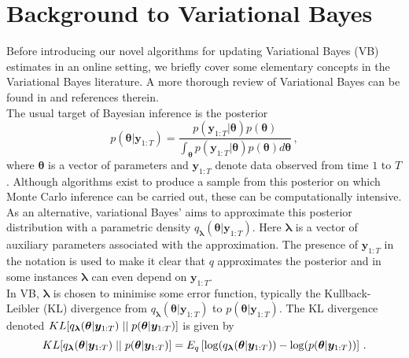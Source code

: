 \documentclass[12pt,a4paper]{article}\usepackage[]{graphicx}\usepackage[]{color}
\begin{document}
\section{Background to Variational Bayes}
\label{sec:background}
{\color{blue} Before introducing our novel algorithms for updating Variational Bayes (VB) estimates in an online setting, we briefly cover some elementary concepts in the Variational Bayes literature.  A more thorough review of Variational Bayes can be found in \cite{Blei2017} and references therein.  
\\

The usual target of Bayesian inference is the posterior
\begin{equation}
\label{posterior}
p({\bm\theta} | {\bm y}_{1:T}) = \frac{p({\bm y}_{1:T} | {\bm\theta})p({\bm\theta})}{\int_{\bm \theta}p({\bm y}_{1:T} | {\bm\theta})p({\bm\theta})d{\bm\theta}}\,,
\end{equation}
where ${\bm\theta}$ is a vector of parameters and ${\bm y}_{1:T}$ denote data observed from time $1$ to $T$.  Although algorithms exist to produce a sample from this posterior on which Monte Carlo inference can be carried out, these can be computationally intensive.  As an alternative, variational Bayes' aims to approximate this posterior distribution with a parametric density $q_{\bm \lambda}({\bm\theta} |{\bm y}_{1:T})$.  Here ${\bm \lambda}$ is a vector of auxiliary parameters associated with the approximation. The presence of ${\bm y}_{1:T}$ in the notation is used to make it clear that $q$ approximates the posterior and in some instances ${\bm\lambda}$ can even depend on ${\bm y}_{1:T}$. 
\\

In VB, ${\bm \lambda}$ is chosen to minimise some error function, typically the Kullback-Leibler (KL) divergence  \citep{Kullback1951} from $q_{\bm \lambda}({\bm \theta} |{\bm y}_{1:T})$ to $p({\bm\theta} |{\bm y}_{1:T})$.  The KL divergence denoted $KL[q_{\bm \lambda}({\bm\theta} |{\bm y}_{1:T})\hspace{.1cm}||\hspace{.1cm}p({\bm\theta} |{\bm y}_{1:T})]$ is given by
\begin{equation}
\label{KL-def}
KL[q_{\bm\lambda}({\bm\theta} |{\bm y}_{1:T})\hspace{.1cm}||\hspace{.1cm}p({\bm\theta} |{\bm y}_{1:T})] = E_q \left[ \log(q_{\bm \lambda}({\bm \theta} |{\bm y}_{1:T})) - \log(p({\bm \theta} |{\bm y}_{1:T})) \right]\,.
\end{equation}

}
\end{document}
